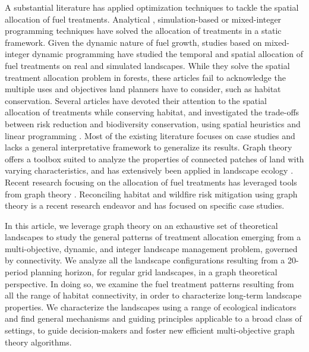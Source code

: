 A substantial literature has applied optimization techniques to tackle the spatial allocation of fuel treatments. Analytical \citep{finney_design_2001}, simulation-based \citep{finney_computational_2007, rytwinski_simulation-optimization_2010} or mixed-integer programming techniques \citep{wei_optimization_2008} have solved the allocation of treatments in a static framework. Given the dynamic nature of fuel growth, studies based on mixed-integer dynamic programming \citep{wei_optimization_2008, minas_spatial_2014, rachmawati_model_2015, rachmawati_optimisation_2016} have studied the temporal and spatial allocation of fuel treatments on real and simulated landscapes. While they solve the spatial treatment allocation problem in forests, these articles fail to acknowledge the multiple uses and objectives land planners have to consider, such as habitat conservation. Several articles have devoted their attention to the spatial allocation of treatments while conserving habitat, and investigated the trade-offs between risk reduction and biodiversity conservation, using spatial heuristics \citep{calkin_modeling_2005, lehmkuhl_seeing_2007} and linear programming \citep{Williams2017, rachmawati_fuel_2018}.
Most of the existing literature focuses on case studies and lacks a general interpretative framework to generalize its results. Graph theory offers a toolbox suited to analyze the properties of connected patches of land with varying characteristics, and has extensively been applied in landscape ecology \citep{urban_landscape_2001, minor_graph-theory_2008, rayfield_multipurpose_2016}. Recent research focusing on the allocation of fuel treatments has leveraged tools from graph theory \citep{matsypura_wildfire_2018, pais_downstream_2021}. Reconciling habitat and wildfire risk mitigation using graph theory is a recent research endeavor \citep{rachmawati_fuel_2018, yemshanov_exploring_2022} and has focused on specific case studies. 

In this article, we leverage graph theory on an exhaustive set of theoretical landscapes to study the general patterns of treatment allocation emerging from a multi-objective, dynamic, and integer landscape management problem, governed by connectivity. We analyze all the landscape configurations resulting from a 20-period planning horizon, for regular grid landscapes, in a graph theoretical perspective.  In doing so, we examine the fuel treatment patterns resulting from all the range of habitat connectivity, in order to characterize long-term landscape properties. We characterize the landscapes using a range of ecological indicators and find general mechanisms and guiding principles applicable to a broad class of settings, to guide decision-makers and foster new efficient multi-objective graph theory algorithms. 

